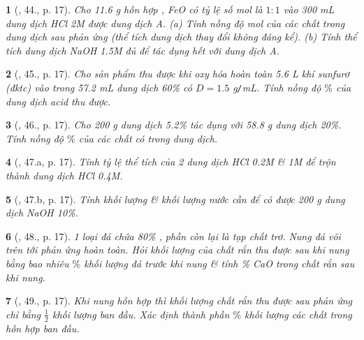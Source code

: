 \documentclass{article}
\newtheorem{baitoan}{}
\begin{document}
\begin{baitoan}[\cite{An_400_BT_Hoa_Hoc_9}, 44., p. 17]
	Cho {\rm11.6 g} hỗn hợp {\rm{}, FeO} có tỷ lệ số mol là $1:1$ vào {\rm300 mL} dung dịch {\rm HCl 2M} được dung dịch A. (a) Tính nồng độ mol của các chất trong dung dịch sau phản ứng (thể tích dung dịch thay đổi không đáng kể). (b) Tính thể tích dung dịch {\rm NaOH 1.5M} đủ để tác dụng hết với dung dịch A.
\end{baitoan}

\begin{baitoan}[\cite{An_400_BT_Hoa_Hoc_9}, 45., p. 17]
	Cho sản phẩm thu được khi oxy hóa hoàn toàn {\rm5.6 L} khí sunfurơ (đktc) vào trong {\rm57.2 mL} dung dịch {\rm{} 60\%} có $D = 1.5$ {\rm g{\tt/}mL}. Tính nồng độ $\%$ của dung dịch acid thu được.
\end{baitoan}

\begin{baitoan}[\cite{An_400_BT_Hoa_Hoc_9}, 46., p. 17]
	Cho {\rm200 g} dung dịch {\rm{} 5.2\%} tác dụng với {\rm58.8 g} dung dịch {\rm{} 20\%}. Tính nồng độ $\%$ của các chất có trong dung dịch.
\end{baitoan}

\begin{baitoan}[\cite{An_400_BT_Hoa_Hoc_9}, 47.a, p. 17]
	Tính tỷ lệ thể tích của 2 dung dịch {\rm HCl 0.2M \& 1M} để trộn thành dung dịch {\rm HCl 0.4M}.
\end{baitoan}

\begin{baitoan}[\cite{An_400_BT_Hoa_Hoc_9}, 47.b, p. 17]
	Tính khối lượng {\rm{}} \& khối lượng nước cần để có được {\rm200 g} dung dịch {\rm NaOH 10\%}.
\end{baitoan}

\begin{baitoan}[\cite{An_400_BT_Hoa_Hoc_9}, 48., p. 17]
	1 loại đá chứa {\rm80\% }, phần còn lại là tạp chất trơ. Nung đá vôi trên tới phản ứng hoàn toàn. Hỏi khối lượng của chất rắn thu được sau khi nung bằng bao nhiêu $\%$ khối lượng đá trước khi nung \& tính {\rm\% CaO} trong chất rắn sau khi nung.
\end{baitoan}

\begin{baitoan}[\cite{An_400_BT_Hoa_Hoc_9}, 49., p. 17]
	Khi nung hỗn hợp {\rm{}} thì khối lượng chất rắn thu được sau phản ứng chỉ bằng $\frac{1}{2}$ khối lượng ban đầu. Xác định thành phần $\%$ khối lượng các chất trong hỗn hợp ban đầu.
\end{baitoan}
\end{document}
